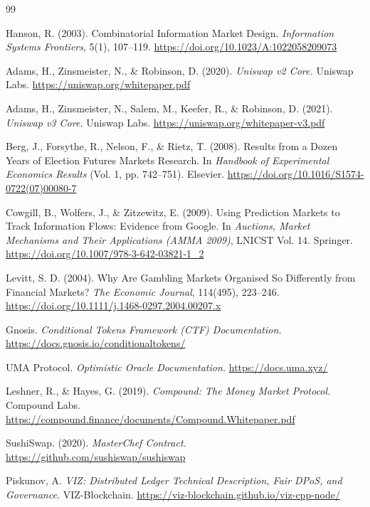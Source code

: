 \documentclass{ledger}
\theoremstyle{plain}
\theoremstyle{remark}
\begin{document}
\begin{thebibliography}{99}

 Hanson, R. (2003). Combinatorial Information Market Design.
\emph{Information Systems Frontiers}, 5(1), 107--119.
\url{https://doi.org/10.1023/A:1022058209073}

 Adams, H., Zinsmeister, N., \& Robinson, D. (2020).
\emph{Uniswap v2 Core.} Uniswap Labs. \url{https://uniswap.org/whitepaper.pdf}

 Adams, H., Zinsmeister, N., Salem, M., Keefer, R., \&
Robinson, D. (2021). \emph{Uniswap v3 Core.} Uniswap Labs.
\url{https://uniswap.org/whitepaper-v3.pdf}

 Berg, J., Forsythe, R., Nelson, F., \& Rietz, T. (2008).
Results from a Dozen Years of Election Futures Markets Research. In
\emph{Handbook of Experimental Economics Results} (Vol. 1, pp. 742--751).
Elsevier. \url{https://doi.org/10.1016/S1574-0722(07)00080-7}

 Cowgill, B., Wolfers, J., \& Zitzewitz, E. (2009). Using
Prediction Markets to Track Information Flows: Evidence from Google. In
\emph{Auctions, Market Mechanisms and Their Applications (AMMA 2009)}, LNICST
Vol. 14. Springer. \url{https://doi.org/10.1007/978-3-642-03821-1_2}

 Levitt, S. D. (2004). Why Are Gambling Markets Organised So
Differently from Financial Markets? \emph{The Economic Journal}, 114(495),
223--246. \url{https://doi.org/10.1111/j.1468-0297.2004.00207.x}

 Gnosis. \emph{Conditional Tokens Framework (CTF)
Documentation.} \url{https://docs.gnosis.io/conditionaltokens/}

 UMA Protocol. \emph{Optimistic Oracle Documentation.}
\url{https://docs.uma.xyz/}

 Leshner, R., \& Hayes, G. (2019). \emph{Compound: The Money
Market Protocol.} Compound Labs.
\url{https://compound.finance/documents/Compound.Whitepaper.pdf}

 SushiSwap. (2020). \emph{MasterChef Contract.}
\url{https://github.com/sushiswap/sushiswap}

 Piskunov, A. \emph{VIZ: Distributed Ledger Technical Description,
Fair DPoS, and Governance.} VIZ-Blockchain.
\url{https://viz-blockchain.github.io/viz-cpp-node/}


\end{thebibliography}
\end{document}
